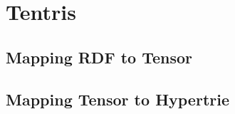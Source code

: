 \section{Tentris}
\label{sec:preliminaries:tentris}

\subsection{Mapping RDF to Tensor}


\subsection{Mapping Tensor to Hypertrie}